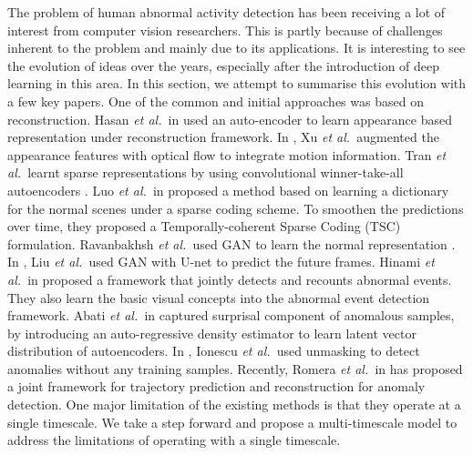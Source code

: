 \documentclass[conference]{IEEEtran}
\def\etal{\emph{et al.~}}
\begin{document}
The problem of human abnormal activity detection has been receiving a lot of interest from computer vision researchers. This is partly because of challenges inherent to the problem and mainly due to its applications. It is interesting to see the evolution of ideas over the years, especially after the introduction of deep learning in this area. In this section, we attempt to summarise this evolution with a few key papers. One of the common and initial approaches was based on reconstruction. Hasan \etal in \cite{hasan2016} used an auto-encoder to learn appearance based representation under reconstruction framework. In \cite{xu2015}, Xu \etal augmented the appearance features with optical flow to integrate motion information. Tran \etal learnt sparse representations by using convolutional winner-take-all autoencoders \cite{tran2017}. Luo \etal in \cite{TSC-RNN} proposed a method based on learning a dictionary for the normal scenes under a sparse coding scheme. To smoothen the predictions over time, they proposed a Temporally-coherent Sparse Coding (TSC) formulation. Ravanbakhsh \etal used GAN to learn the normal representation \cite{gan2017}. In \cite{future}, Liu \etal used GAN with U-net to predict the future frames. Hinami \etal in \cite{hinami2017} proposed a framework that jointly detects and recounts abnormal events. They also learn the basic visual concepts into the abnormal event detection framework. Abati \etal in \cite{novelty} captured surprisal component of anomalous samples, by introducing  an auto-regressive density estimator to learn latent vector distribution of autoencoders. In \cite{unmask}, Ionescu \etal used unmasking to detect anomalies without any training samples.  Recently, Romera \etal in \cite{pose} has proposed a joint framework for trajectory prediction and reconstruction for anomaly detection. One major limitation of the existing methods is that they operate at a single timescale. We take a step forward and propose a multi-timescale model to address the limitations of operating with a single timescale.
\end{document}
